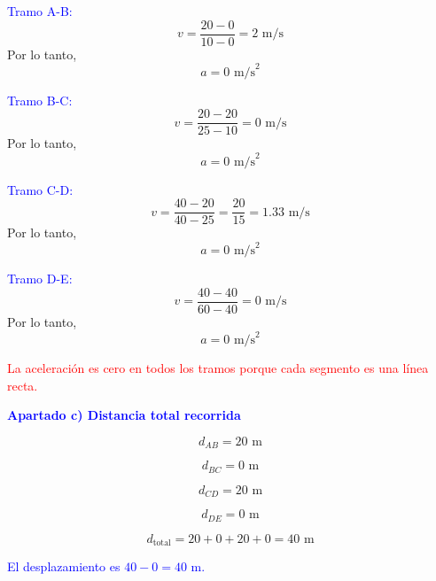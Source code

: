 \begin{exercise}
\begin{solu}
        \textcolor{blue}{Tramo A-B:}
        \[
        v=\frac{20-0}{10-0}=2\text{ m/s}
        \]
        Por lo tanto,
        \[
        \boxed{a=0\text{ m/s}^2}
        \]

        \textcolor{blue}{Tramo B-C:}
        \[
        v=\frac{20-20}{25-10}=0\text{ m/s}
        \]
        Por lo tanto,
        \[
        \boxed{a=0\text{ m/s}^2}
        \]

        \textcolor{blue}{Tramo C-D:}
        \[
        v=\frac{40-20}{40-25}=\frac{20}{15}=1.33\text{ m/s}
        \]
        Por lo tanto,
        \[
        \boxed{a=0\text{ m/s}^2}
        \]

        \textcolor{blue}{Tramo D-E:}
        \[
        v=\frac{40-40}{60-40}=0\text{ m/s}
        \]
        Por lo tanto,
        \[
        \boxed{a=0\text{ m/s}^2}
        \]

        \textcolor{red}{La aceleración es cero en todos los tramos porque cada segmento es una línea recta.}

        \vspace{0.5cm}

        \textbf{\textcolor{blue}{Apartado c) Distancia total recorrida}}

        \[
        d_{AB}=20\text{ m}
        \]

        \[
        d_{BC}=0\text{ m}
        \]

        \[
        d_{CD}=20\text{ m}
        \]

        \[
        d_{DE}=0\text{ m}
        \]

        \[
        d_{\text{total}}=20+0+20+0=\boxed{40\text{ m}}
        \]

        \textcolor{blue}{El desplazamiento es $40-0=40$ m.}
    \end{solu}
\end{exercise}

